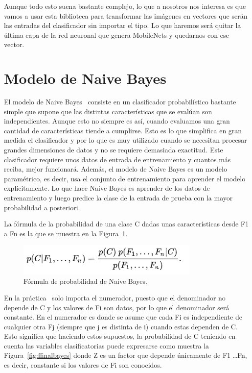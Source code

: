\documentclass[a4paper, 12pt]{book}
\begin{document}
Aunque todo esto suena bastante complejo, lo que a nosotros nos interesa es que vamos a usar esta biblioteca para transformar las imágenes en vectores que serán las entradas del clasificador sin importar el tipo. Lo que haremos será quitar la última capa de la red neuronal que genera MobileNets y quedarnos con ese vector.

\section{Modelo de Naive Bayes} 
\label{sec:modelobayes}

El modelo de Naive Bayes~\cite{articulobayes} consiste en un clasificador probabilístico bastante simple que supone que las distintas características que se evalúan son independientes. Aunque esto no siempre es así, cuando evaluamos una gran cantidad de características tiende a cumplirse. Esto es lo que simplifica en gran medida el clasificador y por lo que es muy utilizado cuando se necesitan procesar grandes dimensiones de datos y no se requiere demasiada exactitud. Este clasificador requiere unos datos de entrada de entrenamiento y cuantos más reciba, mejor funcionará. Además, el modelo de Naive Bayes es un modelo paramétrico, es decir, usa el conjunto de entrenamiento para aprender el modelo explícitamente. Lo que hace Naive Bayes es aprender de los datos de entrenamiento y luego predice la clase de la entrada de prueba con la mayor probabilidad a posteriori.

La fórmula de la probabilidad de una clase C dadas unas características desde F1 a Fn es la que se muestra en la Figura~\ref{fig:formulabayes}.

\begin{figure}
	\centering
	\includegraphics[width=9cm, keepaspectratio]{img/formulabayes}
	\caption{Fórmula de probabilidad de Naive Bayes.}
	\label{fig:formulabayes}
\end{figure}

En la práctica~\cite{machinelearning} solo importa el numerador, puesto que el denominador no depende de C y los valores de Fi son datos, por lo que el denominador será constante. En el numerador es donde se asume que cada Fi es independiente de cualquier otra Fj (siempre que j es distinta de i) cuando estas dependen de C. Esto significa que haciendo estos supuestos, la probabilidad de C teniendo en cuenta las variables clasificatorias puede expresarse como muestra la Figura~\ref{fig:ffinalbayes} donde Z es un factor que depende únicamente de F1 \dots Fn, es decir, constante si los valores de Fi son conocidos.
\end{document}
